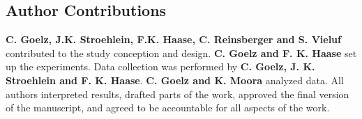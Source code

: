 \subsection*{Author Contributions}
\textbf{C. Goelz, J.K. Stroehlein, F.K. Haase, C. Reinsberger and S. Vieluf} contributed to the study conception and design. \textbf{C. Goelz and F. K. Haase} set up the experiments. Data collection was performed by \textbf{C. Goelz, J. K. Stroehlein and F. K. Haase}. \textbf{C. Goelz and K. Moora} analyzed data. All authors interpreted results, drafted parts of the work, approved the final version of the manuscript, and agreed to be accountable for all aspects of the work.